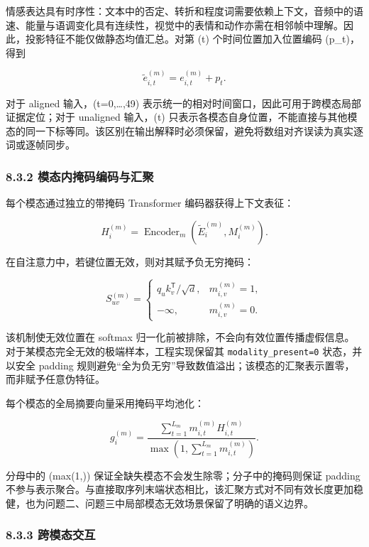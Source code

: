 \documentclass[
  12pt,
  a4paper,
]{ctexart}
\begin{document}
情感表达具有时序性：文本中的否定、转折和程度词需要依赖上下文，音频中的语速、能量与语调变化具有连续性，视觉中的表情和动作亦需在相邻帧中理解。因此，投影特征不能仅做静态均值汇总。对第
(t) 个时间位置加入位置编码 (p\_t)，得到

\[
\widetilde e_{i,t}^{(m)}=e_{i,t}^{(m)}+p_t.
\]

对于 aligned 输入，(t=0,\ldots,49)
表示统一的相对时间窗口，因此可用于跨模态局部证据定位；对于 unaligned
输入，(t)
只表示各模态自身位置，不能直接与其他模态的同一下标等同。该区别在输出解释时必须保留，避免将数组对齐误读为真实逐词或逐帧同步。

\hypertarget{ux6a21ux6001ux5185ux63a9ux7801ux7f16ux7801ux4e0eux6c47ux805a}{%
\subsubsection{8.3.2
模态内掩码编码与汇聚}\label{ux6a21ux6001ux5185ux63a9ux7801ux7f16ux7801ux4e0eux6c47ux805a}}

每个模态通过独立的带掩码 Transformer 编码器获得上下文表征：

\[
H_i^{(m)}=\operatorname{Encoder}_m(\widetilde E_i^{(m)},M_i^{(m)}).
\]

在自注意力中，若键位置无效，则对其赋予负无穷掩码：

\[
S_{uv}^{(m)}=
\begin{cases}
q_u k_v^{\mathsf T}/\sqrt d,&m_{i,v}^{(m)}=1,\\
-\infty,&m_{i,v}^{(m)}=0.
\end{cases}
\]

该机制使无效位置在 softmax
归一化前被排除，不会向有效位置传播虚假信息。对于某模态完全无效的极端样本，工程实现保留其
\texttt{modality\_present=0} 状态，并以安全 padding
规则避免``全为负无穷''导致数值溢出；该模态的汇聚表示置零，而非赋予任意伪特征。

每个模态的全局摘要向量采用掩码平均池化：

\[
g_i^{(m)}=
\frac{\sum_{t=1}^{L_m}m_{i,t}^{(m)}H_{i,t}^{(m)}}
{\max(1,\sum_{t=1}^{L_m}m_{i,t}^{(m)})}.
\]

分母中的 (max(1,\cdot)) 保证全缺失模态不会发生除零；分子中的掩码则保证
padding
不参与表示聚合。与直接取序列末端状态相比，该汇聚方式对不同有效长度更加稳健，也为问题二、问题三中局部模态无效场景保留了明确的语义边界。

\hypertarget{ux8de8ux6a21ux6001ux4ea4ux4e92}{%
\subsubsection{8.3.3 跨模态交互}\label{ux8de8ux6a21ux6001ux4ea4ux4e92}}
\end{document}
